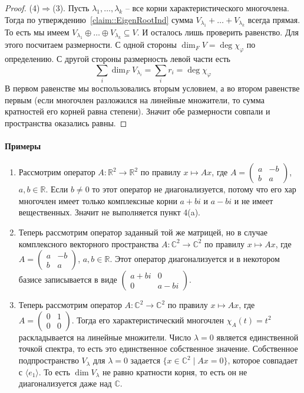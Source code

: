 \begin{proof}
(4)$\Rightarrow$(3).
Пусть $\lambda_1,\ldots,\lambda_k$ -- все корни характеристического многочлена.
Тогда по утверждению~\ref{claim::EigenRootInd} сумма $V_{\lambda_1}+\ldots +V_{\lambda_k}$ всегда прямая.
То есть мы имеем $V_{\lambda_1}\oplus \ldots \oplus V_{\lambda_k}\subseteq V$.
И осталось лишь проверить равенство.
Для этого посчитаем размерности.
С одной стороны $\dim_F V = \deg \chi_\varphi$ по определению.
С другой стороны размерность левой части есть
\[
\sum_{i}\dim_F V_{\lambda_i} = \sum_i r_i = \deg \chi_\varphi
\]
В первом равенстве мы воспользовались вторым условием, а во втором равенстве первым (если многочлен разложился на линейные множители, то сумма кратностей его корней равна степени).
Значит обе размерности совпали и пространства оказались равны.
\end{proof}

\paragraph{Примеры}

\begin{enumerate}
\item Рассмотрим оператор $A\colon \mathbb R^2 \to \mathbb R^2$ по правилу $x\mapsto Ax$, где $A =\left( \begin{smallmatrix}{a}&{-b}\\{b}&{a}\end{smallmatrix}\right)$, $a, b\in\mathbb R$.
Если $b\neq 0$ то этот оператор не диагонализуется, потому что его хар многочлен имеет только комплексные корни $a+bi$ и $a - bi$ и не имеет вещественных.
Значит не выполняется пункт 4(a).

\item Теперь рассмотрим оператор заданный той же матрицей, но в случае комплексного векторного пространства $A\colon \mathbb C^2 \to \mathbb C^2$ по правилу $x\mapsto Ax$, где $A =\left( \begin{smallmatrix}{a}&{-b}\\{b}&{a}\end{smallmatrix}\right)$, $a, b\in\mathbb R$.
Этот оператор диагонализуется и в некотором базисе записывается в виде $\left( \begin{smallmatrix}{a + bi}&{0}\\{0}&{a-bi}\end{smallmatrix}\right)$.

\item Теперь рассмотрим оператор $A\colon \mathbb C^2 \to \mathbb C^2$ по правилу $x\mapsto Ax$, где $A =\left( \begin{smallmatrix}{0}&{1}\\{0}&{0}\end{smallmatrix}\right)$.
Тогда его характеристический многочлен $\chi_A(t) = t^2$ раскладывается на линейные множители.
Число $\lambda = 0$ является единственной точкой спектра, то есть это единственное собственное значение.
Собственное подпространство $V_\lambda$ для $\lambda = 0$ задается $\{x\in \mathbb C^2\mid Ax = 0\}$, которое совпадает с $\langle e_1 \rangle$.
То есть $\dim V_\lambda$ не равно кратности корня, то есть он не диагонализуется даже над $\mathbb C$.
\end{enumerate}

